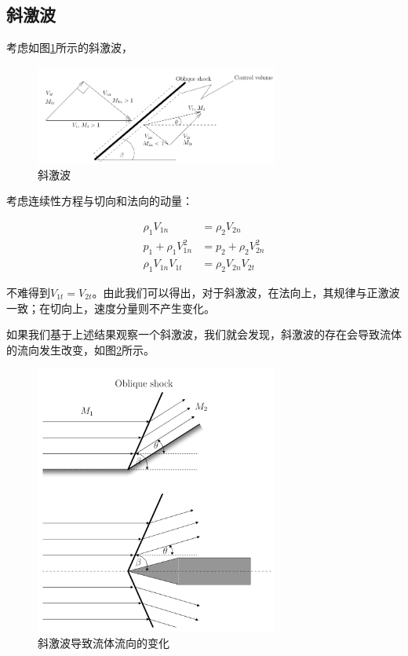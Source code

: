 \subsection{斜激波}

考虑如图\ref{4}所示的斜激波，

\begin{figure}[!ht]
    \centering
    \includegraphics[width=8cm]{figures/4.png}
    \caption{斜激波}
    \label{4}
\end{figure}

考虑连续性方程与切向和法向的动量：

\begin{align*}
    \rho_{1} V_{1 n}&=\rho_{2} V_{2 n}\\ 
    p_{1}+\rho_{1} V_{1 n}^{2}&=p_{2}+\rho_{2} V_{2 n}^{2}\\ 
    \rho_{1} V_{1 n} V_{1 t}&=\rho_{2} V_{2 n} V_{2 t}
\end{align*}

不难得到$V_{1t}=V_{2t}$。由此我们可以得出，对于斜激波，在法向上，其规律与正激波一致；在切向上，速度分量则不产生变化。

如果我们基于上述结果观察一个斜激波，我们就会发现，斜激波的存在会导致流体的流向发生改变，如图\ref{5}所示。

\begin{figure}[!ht]
    \centering
    \includegraphics[width=8cm]{figures/5.png}
    \caption{斜激波导致流体流向的变化}
    \label{5}
\end{figure}

